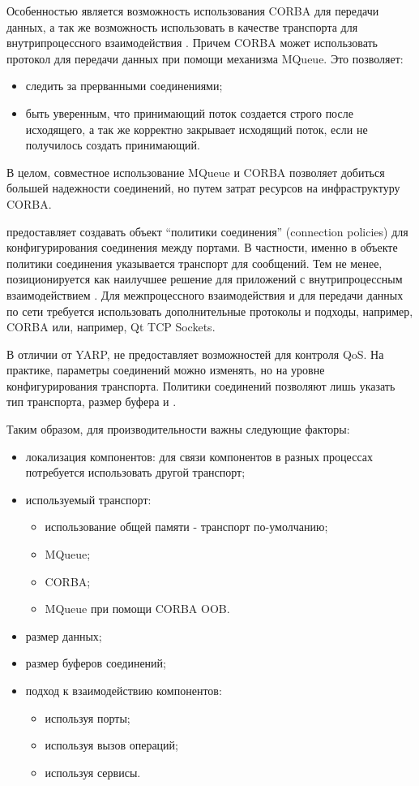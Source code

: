 Особенностью \orocos{} является возможность использования CORBA для передачи данных, а так же возможность использовать в качестве транспорта для внутрипроцессного взаимодействия . Причем CORBA может использовать протокол  для передачи данных при помощи механизма MQueue. Это позволяет:
\begin{itemize}[noitemsep]
	\item следить за прерванными соединениями;
	\item быть уверенным, что принимающий поток создается строго после исходящего, а так же корректно закрывает исходящий поток, если не получилось создать принимающий.
\end{itemize}
В целом, совместное использование MQueue и CORBA позволяет добиться большей надежности соединений, но путем затрат ресурсов на инфраструктуру CORBA.

\orocos{} предоставляет создавать объект \enquote{политики соединения} (connection policies) для конфигурирования соединения между портами. В частности, именно в объекте политики соединения указывается транспорт для сообщений. Тем не менее, \orocos{} позиционируется как наилучшее решение для приложений с внутрипроцессным взаимодействием \cite{orocos-interprocess-case}. Для межпроцессного взаимодействия и для передачи данных по сети требуется использовать дополнительные протоколы и подходы, например, CORBA или, например, Qt TCP Sockets.

В отличии от YARP, \toolchain{} не предоставляет возможностей для контроля QoS. На практике, параметры соединений можно изменять, но на уровне конфигурирования транспорта. Политики соединений позволяют лишь указать тип транспорта, размер буфера и .

Таким образом, для производительности \rtt{} важны следующие факторы:
\begin{itemize}[noitemsep]
	\item локализация компонентов: для связи компонентов в разных процессах потребуется использовать другой транспорт;
	\item используемый транспорт:
	\begin{itemize}[noitemsep]
		\item использование общей памяти - транспорт по-умолчанию;
		\item MQueue;
		\item CORBA;
		\item MQueue при помощи CORBA OOB.
	\end{itemize}
	\item размер данных;
	\item размер буферов соединений;
	\item подход к взаимодействию компонентов:
	\begin{itemize}[noitemsep]
		\item используя порты;
		\item используя вызов операций;
		\item используя сервисы.
	\end{itemize}
\end{itemize}